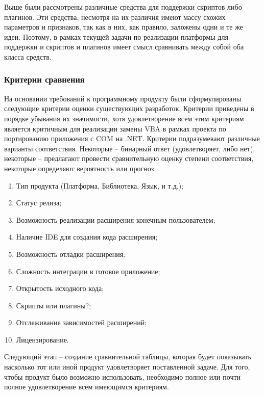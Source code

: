 Выше были рассмотрены различные средства для поддержки скриптов либо плагинов. Эти средства, несмотря на их различия имеют массу схожих параметров и признаков, так как в них, как правило, заложены одни и те же идеи. Поэтому, в рамках текущей задачи по реализации платформы для поддержки и скриптов и плагинов имеет смысл сравнивать между собой оба класса средств.

\subsubsection{Критерии сравнения}
На основании требований к программному продукту были сформулированы следующие критерии оценки существующих разработок. Критерии приведены в порядке убывания их значимости, хотя удовлетворение всем этим критериям является критичным для реализации замены VBA в рамках проекта по портированию приложения с COM на .NET. Критерии подразумевают различные варианты соответствия. Некоторые – бинарный ответ (удовлетворяет, либо нет), некоторые – предлагают провести сравнительную оценку степени соответствия, некоторые определяют вероятность или прогноз.

\begin{enumerate}
\item Тип продукта (Платформа, Библиотека, Язык, и т.д.);
\item Статус релиза;
\item Возможность реализации расширения конечным пользователем;
\item Наличие IDE для создания кода расширения;
\item Возможность отладки расширения;
\item Сложность интеграции в готовое приложение;
\item Открытость исходного кода;
\item Скрипты или плагины?;
\item Отслеживание зависимостей расширений;
\item Лицензирование.
\end{enumerate}

Следующий этап – создание сравнительной таблицы, которая будет показывать насколько тот или иной продукт удовлетворяет поставленной задаче. Для того, чтобы продукт было возможно использовать, необходимо полное или почти полное удовлетворение всем имеющимся критериям.

\pagebreak
